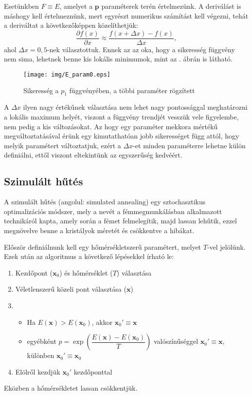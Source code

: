 \documentclass[12pt]{article}
\begin{document}
Esetünkben $F \equiv E$, amelyet a $\mathbf{p}$ paraméterek terén értelmezünk. A deriválást is máshogy kell értelmeznünk, mert egyrészt numerikus számítást kell végezni, tehát a deriváltat a következőképpen közelíthetjük:
\begin{equation}
	\frac{\partial f(x)}{\partial x} \approx \frac{f(x+\Delta x) - f(x)}{\Delta x},
\end{equation}
ahol $\Delta x = 0,5$-nek választottuk. Ennek az az oka, hogy a sikeresség függvény nem sima, lehetnek benne kis lokális minimumok, mint az . ábrán is látható. 
\begin{figure}[H]
	\centering
	\texttt{[image: img/E\_param0.eps]}
	\caption{Sikeresség a $p_1$ függvényében, a többi paraméter rögzített}
	\label{E_param1}
\end{figure}
A $\Delta x$ ilyen nagy értékűnek választása nem lehet nagy pontossággal meghatározni a lokális maximum helyét, viszont a függvény trendjét vesszük vele figyelembe, nem pedig a kis változásokat. Az hogy egy paraméter mekkora mértékű megváltoztatásával érünk egy kimutathatóan jobb sikerességet függ attól, hogy melyik paramétert változtatjuk, ezért a $\Delta x$-et minden paraméterre lehetne külön definiálni, ettől viszont eltekintünk az egyszerűség kedvéért.
\subsection{Szimulált hűtés}
A szimulált hűtés (angolul: simulated annealing) \cite{simulated_annealing} egy sztochasztikus optimalizációs módszer, mely a nevét a fémmegmunkálásban alkalmazott technikáról kapta, amely során a fémet felmelegítik, majd lassan lehűtik, ezzel megnövelve benne a kristályok méretét és csökkentve a hibákat.

Először definiálnunk kell egy hőmérsékletszerű paramétert, melyet $T$-vel jelölünk. Ezek után az algoritmus a következő lépésekkel írható le:
\begin{enumerate} %
	\item Kezdőpont ($\mathbf{x}_0$) és hőmérséklet ($T$) választása
	\item Véletlenszerű közeli pont választása ($\mathbf{x}$) \label{veletlen_kozeli_pont}
	\item \begin{itemize} %
		\item Ha $E(\mathbf{x}) > E(\mathbf{x}_0) $, akkor $\mathbf{x}_0' \equiv \mathbf{x}$
		\item egyébként $\displaystyle p = \exp\left(\dfrac{E(\mathbf{x}) - E(\mathbf{x}_0)}{T}\right)$ valószínűséggel $\mathbf{x}_0' \equiv \mathbf{x}$, különben $\mathbf{x}_0' \equiv \mathbf{x}_0$
	\end{itemize}
	\item Elölről kezdjük $\mathbf{x}_0'$ kezdőponttal
\end{enumerate} %
Eközben a hőmérsékletet lassan csökkentjük.
\end{document}
